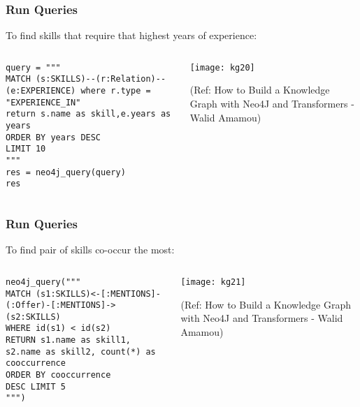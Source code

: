 \begin{frame}[fragile]\frametitle{Run Queries}

To find skills that require that highest years of experience:

\begin{columns}
    \begin{column}[T]{0.6\linewidth}
		
			\begin{lstlisting}
query = """
MATCH (s:SKILLS)--(r:Relation)--(e:EXPERIENCE) where r.type = "EXPERIENCE_IN"
return s.name as skill,e.years as years
ORDER BY years DESC
LIMIT 10
"""
res = neo4j_query(query)
res
			\end{lstlisting}
    \end{column}
    \begin{column}[T]{0.4\linewidth}
			\begin{center}
			\texttt{[image: kg20]}
			\end{center}	
			
			{\tiny (Ref: How to Build a Knowledge Graph with Neo4J and Transformers - Walid Amamou)}	
    \end{column}			
\end{columns}
			
\end{frame}

\begin{frame}[fragile]\frametitle{Run Queries}

To find  pair of skills co-occur the most:

\begin{columns}
    \begin{column}[T]{0.6\linewidth}
		
			\begin{lstlisting}
neo4j_query("""
MATCH (s1:SKILLS)<-[:MENTIONS]-(:Offer)-[:MENTIONS]->(s2:SKILLS)
WHERE id(s1) < id(s2)
RETURN s1.name as skill1, s2.name as skill2, count(*) as cooccurrence
ORDER BY cooccurrence
DESC LIMIT 5
""")
			\end{lstlisting}
    \end{column}
    \begin{column}[T]{0.4\linewidth}
			\begin{center}
			\texttt{[image: kg21]}
			\end{center}	
			
			{\tiny (Ref: How to Build a Knowledge Graph with Neo4J and Transformers - Walid Amamou)}	
    \end{column}			
\end{columns}
			
\end{frame}

